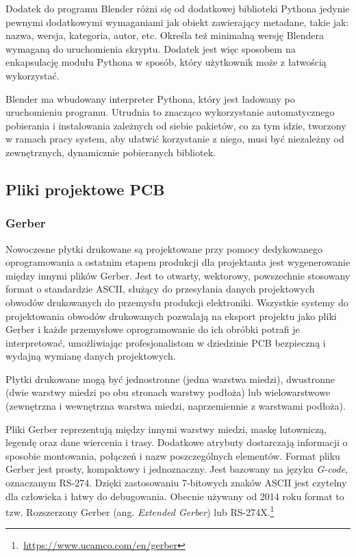 \documentclass[brudnopis]{xmgr}
\begin{document}
Dodatek do programu Blender różni się od dodatkowej biblioteki Pythona jedynie pewnymi dodatkowymi wymaganiami jak obiekt zawierający metadane, takie jak: nazwa, wersja, kategoria, autor, etc. Określa też minimalną wersję Blendera wymaganą do uruchomienia skryptu. Dodatek jest więc sposobem na enkapsulację modułu Pythona w sposób, który użytkownik może z łatwością wykorzystać.

Blender ma wbudowany interpreter Pythona, który jest ładowany po uruchomieniu programu. Utrudnia to znacząco wykorzystanie automatycznego pobierania i instalowania zależnych od siebie pakietów, co za tym idzie, tworzony w ramach pracy system, aby ułatwić korzystanie z niego, musi być niezależny od zewnętrznych, dynamicznie pobieranych bibliotek.


\subsection{Pliki projektowe PCB}

\subsubsection {Gerber}
Nowoczesne płytki drukowane są projektowane przy pomocy dedykowanego oprogramowania a ostatnim etapem produkcji dla projektanta jest wygenerowanie między innymi plików Gerber.\cite{Khandpur}
Jest to otwarty, wektorowy, powszechnie stosowany format o standardzie ASCII, służący do przesyłania danych projektowych obwodów drukowanych do przemysłu produkcji elektroniki. Wszystkie systemy do projektowania obwodów drukowanych pozwalają na eksport projektu jako pliki Gerber i każde przemysłowe oprogramowanie do ich obróbki potrafi je interpretować, umożliwiając profesjonalistom w dziedzinie PCB bezpieczną i wydajną wymianę danych projektowych.\cite{Williams}

Płytki drukowane mogą być jednostronne (jedna warstwa miedzi), dwustronne (dwie warstwy miedzi po obu stronach warstwy podłoża) lub wielowarstwowe (zewnętrzna i wewnętrzna warstwa miedzi, naprzemiennie z warstwami podłoża).\cite{schroeder}

Pliki Gerber reprezentują między innymi warstwy miedzi, maskę lutowniczą, legendę oraz dane wiercenia i trasy. Dodatkowe atrybuty dostarczają informacji o sposobie montowania, połączeń i nazw poszczególnych elementów. Format pliku Gerber jest prosty, kompaktowy i jednoznaczny. Jest bazowany na języku \emph{G-code}, oznaczanym RS-274. Dzięki zastosowaniu 7-bitowych znaków ASCII jest czytelny dla człowieka i łatwy do debugowania. Obecnie używany od 2014 roku format to tzw. Rozszerzony Gerber (ang. \emph{Extended Gerber}) lub RS-274X.\footnote{\,\url{https://www.ucamco.com/en/gerber}}
\end{document}
